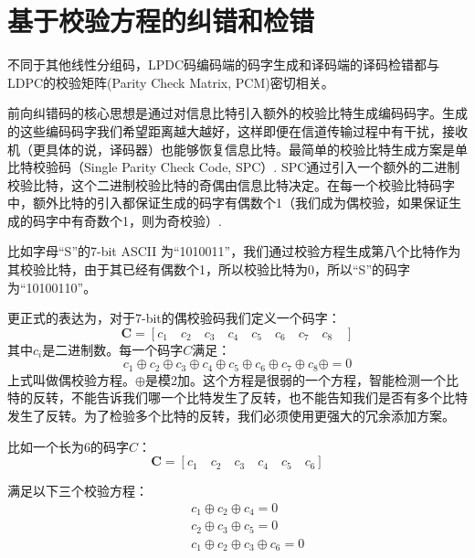 \documentclass[10pt,a4paper,UTF8]{article}
\begin{document}
\section{基于校验方程的纠错和检错}
\label{sec:orgfea162c}


不同于其他线性分组码，LPDC码编码端的码字生成和译码端的译码检错都与LDPC的校验矩阵(Parity Check Matrix, PCM)密切相关。

前向纠错码的核心思想是通过对信息比特引入额外的校验比特生成编码码字。生成的这些编码码字我们希望距离越大越好，这样即便在信道传输过程中有干扰，接收机（更具体的说，译码器）也能够恢复信息比特。最简单的校验比特生成方案是单比特校验码（Single Parity Check Code, SPC）. SPC通过引入一个额外的二进制校验比特，这个二进制校验比特的奇偶由信息比特决定。在每一个校验比特码字中，额外比特的引入都保证生成的码字有偶数个1（我们成为偶校验，如果保证生成的码字中有奇数个1，则为奇校验）.

比如字母“S”的7-bit ASCII 为“1010011”，我们通过校验方程生成第八个比特作为其校验比特，由于其已经有偶数个1，所以校验比特为0，所以“S”的码字为“10100110”。

更正式的表达为，对于7-bit的偶校验码我们定义一个码字：
\begin{equation}
\label{eq:1}
\mathbf{C} = [c_{1}\quad c_{2}\quad c_{3}\quad c_{4}\quad c_{5}\quad c_{6}\quad c_{7}\quad c_{8}\quad ]
\end{equation}
其中\(c_{i}\)是二进制数。每一个码字\(C\)满足：
\begin{equation}
\label{eq:2}
c_{1}\oplus c_{2} \oplus c_{3}\oplus c_{4} \oplus c_{5} \oplus c_{6} \oplus c_{7}\oplus c_{8} \oplus = 0
\end{equation}
上式叫做偶校验方程。\(\oplus\)是模2加。这个方程是很弱的一个方程，智能检测一个比特的反转，不能告诉我们哪一个比特发生了反转，也不能告知我们是否有多个比特发生了反转。为了检验多个比特的反转，我们必须使用更强大的冗余添加方案。

比如一个长为6的码字\(C\)：
\begin{equation}
\label{eq:3}
\mathbf{C} = [c_{1}\quad c_{2}\quad c_{3}\quad c_{4}\quad c_{5}\quad c_{6} ]
\end{equation}

满足以下三个校验方程：
\begin{eqnarray*}
&&c_{1} \oplus c_{2} \oplus c_{4} = 0 \\
&&c_{2} \oplus c_{3} \oplus c_{5} = 0 \\
&&c_{1} \oplus c_{2} \oplus c_{3}\oplus c_{6} = 0
\end{eqnarray*}
\end{document}
